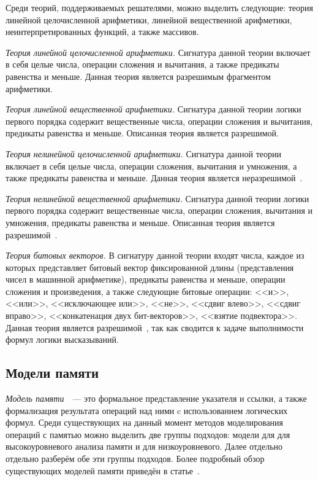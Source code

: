 Среди теорий, поддерживаемых решателями, можно выделить следующие: теория линейной целочисленной арифметики, линейной вещественной арифметики, неинтерпретированных функций, а также массивов.

\emph{Теория линейной целочисленной арифметики.} Сигнатура данной теории включает в себя целые числа, операции сложения и вычитания, а также предикаты равенства и меньше. Данная теория является разрешимым фрагментом арифметики.

\emph{Теория линейной вещественной арифметики.} Сигнатура данной теории логики первого порядка содержит вещественные числа, операции сложения и вычитания, предикаты равенства и меньше. Описанная теория является разрешимой.

\emph{Теория нелинейной целочисленной арифметики.} Сигнатура данной теории включает в себя целые числа, операции сложения, вычитания и умножения, а также предикаты равенства и меньше. Данная теория является неразрешимой~\cite{godel1931formal}.

\emph{Теория нелинейной вещественной арифметики.} Сигнатура данной теории логики первого порядка содержит вещественные числа, операции сложения, вычитания и умножения, предикаты равенства и меньше. Описанная теория является разрешимой~\cite{tarski1998decision}.

\emph{Теория битовых векторов.} В сигнатуру данной теории входят числа, каждое из которых представляет битовый вектор фиксированной длины (представления чисел в машинной арифметике), предикаты равенства и меньше, операции сложения и произведения, а также следующие битовые операции: <<и>>, <<или>>, <<исключающее или>>, <<не>>, <<сдвиг влево>>, <<сдвиг вправо>>, <<конкатенация двух бит-векторов>>, <<взятие подвектора>>. Данная теория является разрешимой~\cite{barrett1998decision}, так как сводится к задаче выполнимости формул логики высказываний.


\subsection{Модели памяти}
\emph{Модель памяти}~\cite{mandrik}~--- это формальное представление указателя и ссылки, а также формализация результата операций над ними c использованием логических формул. Среди существующих на данный момент методов моделирования операций с памятью можно выделить две группы подходов: модели для для высокоуровневого анализа памяти и для низкоуровневого. Далее отдельно отдельно разберём обе эти группы подходов. Более подробный обзор существующих моделей памяти приведён в статье~\cite{mandrik}.

